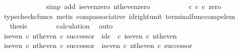 \begin{isabellebody}
\ \isamarkupfalse%
\ {\isachardoublequoteopen}{\isachardot}{\kern0pt}{\isachardot}{\kern0pt}{\isachardot}{\kern0pt}\ {\isacharequal}{\kern0pt}\ {\isasymt}{\isachardoublequoteclose}\isanewline
\ \ \ \ \ \ \isamarkupfalse%
\ {\isacharparenleft}{\kern0pt}simp\ add{\isacharcolon}{\kern0pt}\ is{\isacharunderscore}{\kern0pt}even{\isacharunderscore}{\kern0pt}zero\ nth{\isacharunderscore}{\kern0pt}even{\isacharunderscore}{\kern0pt}zero{\isacharparenright}{\kern0pt}\isanewline
\ \ \ \ \isamarkupfalse%
\ \isamarkupfalse%
\ {\isachardoublequoteopen}{\isachardot}{\kern0pt}{\isachardot}{\kern0pt}{\isachardot}{\kern0pt}\ {\isacharequal}{\kern0pt}\ {\isacharparenleft}{\kern0pt}{\isasymt}\ {\isasymcirc}\isactrlsub c\ {\isasymbeta}\isactrlbsub {\isasymnat}\isactrlsub c\isactrlesub {\isacharparenright}{\kern0pt}\ {\isasymcirc}\isactrlsub c\ zero{\isachardoublequoteclose}\isanewline
\ \ \ \ \ \ \isamarkupfalse%
\ {\isacharparenleft}{\kern0pt}typecheck{\isacharunderscore}{\kern0pt}cfuncs{\isacharcomma}{\kern0pt}\ metis\ comp{\isacharunderscore}{\kern0pt}associative{}\ id{\isacharunderscore}{\kern0pt}right{\isacharunderscore}{\kern0pt}unit{}\ terminal{\isacharunderscore}{\kern0pt}func{\isacharunderscore}{\kern0pt}comp{\isacharunderscore}{\kern0pt}elem{\isacharparenright}{\kern0pt}\isanewline
\ \ \ \ \isamarkupfalse%
\ \isamarkupfalse%
\ {\isacharquery}{\kern0pt}thesis\isanewline
\ \ \ \ \ \ \isamarkupfalse%
\ calculation\ \isamarkupfalse%
\ auto\isanewline
\ \ \isamarkupfalse%
\isanewline
\isanewline
\ \ \isamarkupfalse%
\ {\isachardoublequoteopen}{\isacharparenleft}{\kern0pt}is{\isacharunderscore}{\kern0pt}even\ {\isasymcirc}\isactrlsub c\ nth{\isacharunderscore}{\kern0pt}even{\isacharparenright}{\kern0pt}\ {\isasymcirc}\isactrlsub c\ successor\ {\isacharequal}{\kern0pt}\ id\isactrlsub c\ {\isasymOmega}\ {\isasymcirc}\isactrlsub c\ is{\isacharunderscore}{\kern0pt}even\ {\isasymcirc}\isactrlsub c\ nth{\isacharunderscore}{\kern0pt}even{\isachardoublequoteclose}\isanewline
\ \ \isamarkupfalse%
\ {\isacharminus}{\kern0pt}\isanewline
\ \ \ \ \isamarkupfalse%
\ {\isachardoublequoteopen}{\isacharparenleft}{\kern0pt}is{\isacharunderscore}{\kern0pt}even\ {\isasymcirc}\isactrlsub c\ nth{\isacharunderscore}{\kern0pt}even{\isacharparenright}{\kern0pt}\ {\isasymcirc}\isactrlsub c\ successor\ {\isacharequal}{\kern0pt}\ is{\isacharunderscore}{\kern0pt}even\ {\isasymcirc}\isactrlsub c\ nth{\isacharunderscore}{\kern0pt}even\ {\isasymcirc}\isactrlsub c\ successor{\isachardoublequoteclose}\isanewline

\end{isabellebody}

